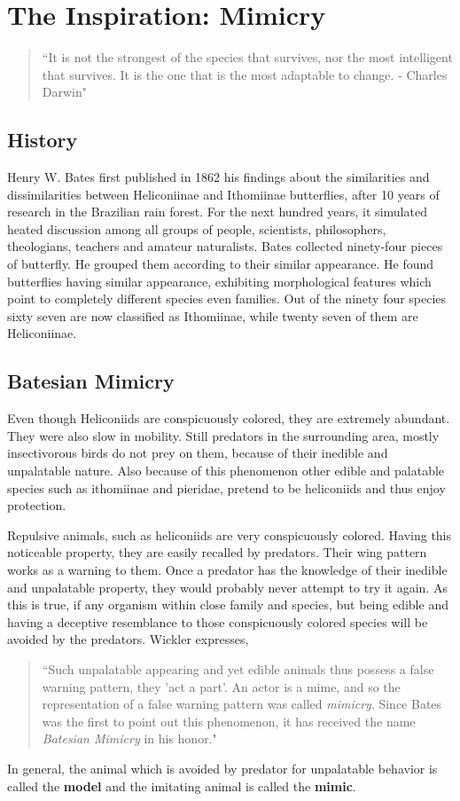 \chapter{The Inspiration: Mimicry}

\begin{quote}
``It is not the strongest of the species that survives, nor the most intelligent that survives. It is the one that is the most adaptable to change. - Charles Darwin"
\end{quote}

\section{History}
Henry W. Bates first published in 1862 his findings about the similarities and dissimilarities between Heliconiinae and Ithomiinae butterflies, after 10 years of research in the Brazilian rain forest. For the next hundred years, it simulated heated discussion among all groups of people, scientists, philosophers, theologians, teachers and amateur naturalists. Bates collected ninety-four pieces of butterfly. He grouped them according to their similar appearance. He found butterflies having similar appearance, exhibiting morphological features which point to completely different species even families. Out of the ninety four species sixty seven are now classified as Ithomiinae, while twenty seven of them are Heliconiinae.

\section{Batesian Mimicry}
Even though Heliconiids are conspicuously colored, they are extremely abundant. They were also slow in mobility. Still predators in the surrounding area, mostly insectivorous birds do not prey on them, because of their inedible and unpalatable nature. Also because of this phenomenon other edible and palatable species such as ithomiinae and pieridae, pretend to be heliconiids and thus enjoy protection.

Repulsive animals, such as heliconiids are very conspicuously colored. Having this noticeable property, they are easily recalled by predators. Their wing pattern works as a warning to them. Once a predator has the knowledge of their inedible and unpalatable property, they would probably never attempt to try it again. As this is true, if any organism within close family and species, but being edible and having a deceptive resemblance to those conspicuously colored species will be avoided by the predators. Wickler \cite{wickler1986} expresses,
\begin{quote}
``Such unpalatable appearing and yet edible animals thus possess a false warning pattern, they 'act a part'. An actor is a mime, and so the representation of a false warning pattern was called \textit{mimicry}. Since Bates was the first to point out this phenomenon, it has received the name \textit{Batesian Mimicry} in his honor."
\end{quote}
In general, the animal which is avoided by predator for unpalatable behavior is called the \textbf{model} and the imitating animal is called the \textbf{mimic}.

